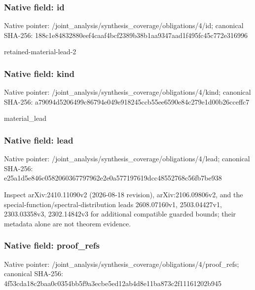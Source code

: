 \documentclass[10pt,a4paper]{article}
\begin{document}
\subsubsection{Native field: id}
Native pointer: /joint\_\allowbreak{}analysis/synthesis\_\allowbreak{}coverage/obligations/4/id; canonical SHA-256: 188c1e84832880eef4caaf4bcf2389b38b1aa9347aad1f495fc45c772e316996

\begingroup\raggedright\sloppy retained-material-lead-2\par\endgroup

\subsubsection{Native field: kind}
Native pointer: /joint\_\allowbreak{}analysis/synthesis\_\allowbreak{}coverage/obligations/4/kind; canonical SHA-256: a79094d5206499c86794e049e918245ccb55ee6590e84c279e1d00b26cceffc7

\begingroup\raggedright\sloppy material\_\allowbreak{}lead\par\endgroup

\subsubsection{Native field: lead}
Native pointer: /joint\_\allowbreak{}analysis/synthesis\_\allowbreak{}coverage/obligations/4/lead; canonical SHA-256: e25a1d5e846c0582060367797962e2e0a577197619dcc48552768c56fb7be938

\begingroup\raggedright\sloppy Inspect arXiv:\allowbreak{}2410.11090v2 (2026-08-18 revision),\allowbreak{} arXiv:\allowbreak{}2106.09806v2,\allowbreak{} and the special-function/\allowbreak{}spectral-distribution leads 2608.07160v1,\allowbreak{} 2503.04427v1,\allowbreak{} 2303.03358v3,\allowbreak{} 2302.14842v3 for additional compatible guarded bounds;\allowbreak{} their metadata alone are not theorem evidence.\par\endgroup

\subsubsection{Native field: proof\_\allowbreak{}refs}
Native pointer: /joint\_\allowbreak{}analysis/synthesis\_\allowbreak{}coverage/obligations/4/proof\_\allowbreak{}refs; canonical SHA-256: 4f53cda18c2baa0c0354bb5f9a3ecbe5ed12ab4d8e11ba873c2f11161202b945
\end{document}
